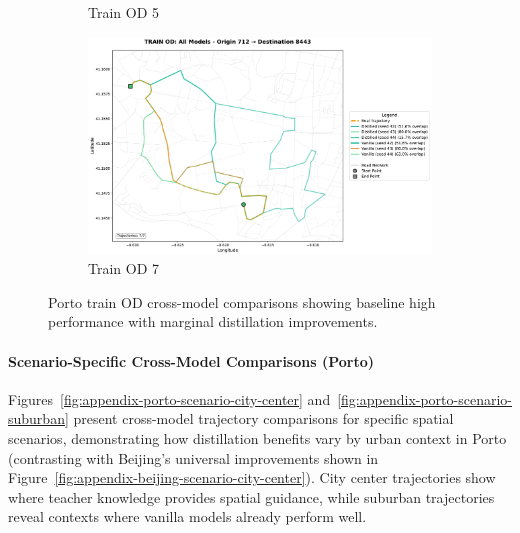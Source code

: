 \begin{figure}[H]
\begin{subfigure}{0.49\linewidth}
        \caption{Train OD 5}
    \end{subfigure}
    \begin{subfigure}{0.49\linewidth}
        \centering
        \includegraphics[width=\linewidth]{assets/plots/eval/porto/cross_model/train/train_od_comparison_7_origin712_dest8443.pdf}
        \caption{Train OD 7}
    \end{subfigure}
    \caption{Porto train OD cross-model comparisons showing baseline high performance with marginal distillation improvements.}
    \label{fig:appendix-porto-cross-train}
\end{figure}

\paragraph{Scenario-Specific Cross-Model Comparisons (Porto)}

Figures~\ref{fig:appendix-porto-scenario-city-center} and~\ref{fig:appendix-porto-scenario-suburban} present cross-model trajectory comparisons for specific spatial scenarios, demonstrating how distillation benefits vary by urban context in Porto (contrasting with Beijing's universal improvements shown in Figure~\ref{fig:appendix-beijing-scenario-city-center}). City center trajectories show where teacher knowledge provides spatial guidance, while suburban trajectories reveal contexts where vanilla models already perform well.

